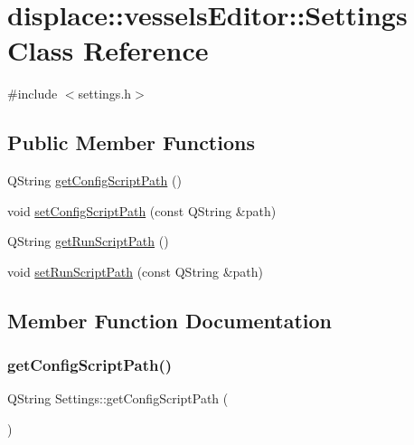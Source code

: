 \hypertarget{classdisplace_1_1vessels_editor_1_1_settings}{}\section{displace\+::vessels\+Editor\+::Settings Class Reference}
\label{classdisplace_1_1vessels_editor_1_1_settings}


{\ttfamily \#include $<$settings.\+h$>$}

\subsection*{Public Member Functions}
\begin{DoxyCompactItemize}
\item 
Q\+String \mbox{\hyperlink{classdisplace_1_1vessels_editor_1_1_settings_ac7aace425e56352198347a82697bb082}{get\+Config\+Script\+Path}} ()
\item 
void \mbox{\hyperlink{classdisplace_1_1vessels_editor_1_1_settings_ae263750d998ce405e6a564ee85ec709e}{set\+Config\+Script\+Path}} (const Q\+String \&path)
\item 
Q\+String \mbox{\hyperlink{classdisplace_1_1vessels_editor_1_1_settings_a5762cdf199442ee3e02cd76e3cc6ce31}{get\+Run\+Script\+Path}} ()
\item 
void \mbox{\hyperlink{classdisplace_1_1vessels_editor_1_1_settings_a7531b64d514c33d4b25e7769704954e7}{set\+Run\+Script\+Path}} (const Q\+String \&path)
\end{DoxyCompactItemize}


\subsection{Member Function Documentation}
\mbox{\label{classdisplace_1_1vessels_editor_1_1_settings_ac7aace425e56352198347a82697bb082}} 
\subsubsection{\texorpdfstring{getConfigScriptPath()}{getConfigScriptPath()}}
{\footnotesize\ttfamily Q\+String Settings\+::get\+Config\+Script\+Path (\begin{DoxyParamCaption}{ }\end{DoxyParamCaption})}

